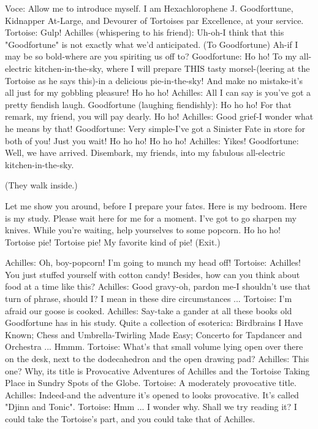 Voce: Allow me to introduce myself. I am Hexachlorophene J. Goodforttune, Kidnapper
       At-Large, and Devourer of Tortoises par Excellence, at your service.
Tortoise: Gulp!
Achilles (whispering to his friend): Uh-oh-I think that this "Goodfortune" is not exactly
       what we'd anticipated. (To Goodfortune) Ah-if I may be so bold-where are you
       spiriting us off to?
Goodfortune: Ho ho! To my all-electric kitchen-in-the-sky, where I will prepare THIS
       tasty morsel-(leering at the Tortoise as he says this)-in a delicious pie-in-the-sky!
       And make no mistake-it's all just for my gobbling pleasure! Ho ho ho!
Achilles: All I can say is you've got a pretty fiendish laugh.
Goodfortune (laughing fiendishly): Ho ho ho! For that remark, my friend, you will pay
       dearly. Ho ho!
Achilles: Good grief-I wonder what he means by that!
Goodfortune: Very simple-I've got a Sinister Fate in store for both of you! Just you wait!
       Ho ho ho! Ho ho ho!
Achilles: Yikes!
Goodfortune: Well, we have arrived. Disembark, my friends, into my fabulous all-electric
       kitchen-in-the-sky.

(They walk inside.)

    Let me show you around, before I prepare your fates. Here is my bedroom. Here is
    my study. Please wait here for me for a moment. I've got to go sharpen my knives.
    While you're waiting, help yourselves to some popcorn. Ho ho ho! Tortoise pie!
    Tortoise pie! My favorite kind of pie! (Exit.)

Achilles: Oh, boy-popcorn! I'm going to munch my head off!
Tortoise: Achilles! You just stuffed yourself with cotton candy! Besides, how can you
       think about food at a time like this?
Achilles: Good gravy-oh, pardon me-I shouldn't use that turn of phrase, should I? I mean
       in these dire circumstances ... Tortoise: I'm afraid our goose is cooked.
Achilles: Say-take a gander at all these books old Goodfortune has in his study. Quite a
       collection of esoterica: Birdbrains I Have Known; Chess and Umbrella-Twirling
       Made Easy; Concerto for Tapdancer and Orchestra ... Hmmm.
Tortoise: What's that small volume lying open over there on the desk, next to the
       dodecahedron and the open drawing pad?
Achilles: This one? Why, its title is Provocative Adventures of Achilles and the Tortoise
       Taking Place in Sundry Spots of the Globe. Tortoise: A moderately provocative
       title.
Achilles: Indeed-and the adventure it's opened to looks provocative. It's called "Djinn and
       Tonic".
Tortoise: Hmm ... I wonder why. Shall we try reading it? I could take the Tortoise's part,
       and you could take that of Achilles.




